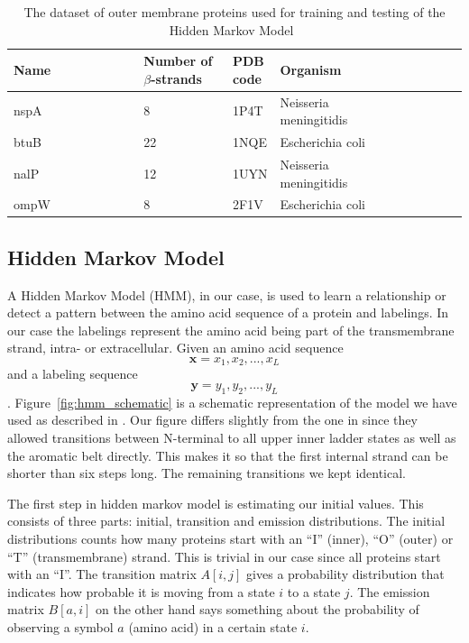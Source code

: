 \documentclass[
	a4paper, %
	11pt, %
	unnumberedsections, %
	twoside, %
  ]{LTJournalArticle}
\begin{document}
\begin{table}
	\caption{The dataset of outer membrane proteins used for training and testing of the Hidden Markov Model~\cite{bagos_hidden_2004}}
	\centering
	\begin{tabular}{L{0.3\linewidth} L{0.2\linewidth} L{0.1\linewidth}L{0.3\linewidth}L{0.3\linewidth}L{0.4\linewidth}} 
        \toprule
        Name          & Number of $\beta$-strands & PDB code & Organism                     \\ \midrule
        nspA          & 8                         & 1P4T     & Neisseria meningitidis       \\
        btuB          & 22                        & 1NQE     & Escherichia coli                \\
        nalP          & 12                        & 1UYN     &  Neisseria meningitidis        \\
        ompW          & 8                         & 2F1V     & Escherichia coli  \\
        \bottomrule
    \end{tabular}
	\label{tab:testset}
\end{table}

\subsection{Hidden Markov Model}

A Hidden Markov Model (HMM), in our case, is used to learn a relationship or detect a pattern between the amino acid sequence of a protein and labelings. In our case the labelings represent the amino acid being part of the transmembrane strand, intra- or extracellular. Given an amino acid sequence $$\mathbf{x} = x_1, x_2 , ... , x_L$$ and a labeling sequence $$\mathbf{y} = y_1,y_2,...,y_L$$. Figure~\ref{fig:hmm_schematic} is a schematic representation of the model we have used as described in \cite{bagos_hidden_2004}. Our figure differs slightly from the one in \cite{bagos_hidden_2004} since they allowed transitions between N-terminal to all upper inner ladder states as well as the aromatic belt directly. This makes it so that the first internal strand can be shorter than six steps long. The remaining transitions we kept identical.

The first step in hidden markov model is estimating our initial values. This consists of three parts: initial, transition and emission distributions. The initial distributions counts how many proteins start with an ``I'' (inner), ``O'' (outer) or ``T'' (transmembrane) strand. This is trivial in our case since all proteins start with an ``I''. The transition matrix $A[i,j]$ gives a probability distribution that indicates how probable it is moving from a state $i$ to a state $j$. The emission matrix $B[a,i]$ on the other hand says something about the probability of observing a symbol $a$ (amino acid) in a certain state $i$.
\end{document}
